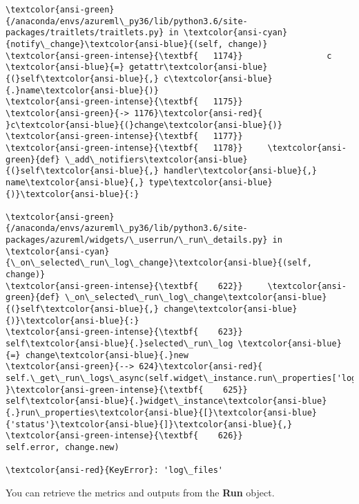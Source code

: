 \documentclass[11pt]{article}
\begin{document}
\begin{Verbatim}[commandchars=\\\{\}, frame=single, framerule=2mm, rulecolor=\color{outerrorbackground}]
\textcolor{ansi-green}{/anaconda/envs/azureml\_py36/lib/python3.6/site-packages/traitlets/traitlets.py} in \textcolor{ansi-cyan}{notify\_change}\textcolor{ansi-blue}{(self, change)}
\textcolor{ansi-green-intense}{\textbf{   1174}}                 c \textcolor{ansi-blue}{=} getattr\textcolor{ansi-blue}{(}self\textcolor{ansi-blue}{,} c\textcolor{ansi-blue}{.}name\textcolor{ansi-blue}{)}
\textcolor{ansi-green-intense}{\textbf{   1175}} 
\textcolor{ansi-green}{-> 1176}\textcolor{ansi-red}{             }c\textcolor{ansi-blue}{(}change\textcolor{ansi-blue}{)}
\textcolor{ansi-green-intense}{\textbf{   1177}} 
\textcolor{ansi-green-intense}{\textbf{   1178}}     \textcolor{ansi-green}{def} \_add\_notifiers\textcolor{ansi-blue}{(}self\textcolor{ansi-blue}{,} handler\textcolor{ansi-blue}{,} name\textcolor{ansi-blue}{,} type\textcolor{ansi-blue}{)}\textcolor{ansi-blue}{:}

\textcolor{ansi-green}{/anaconda/envs/azureml\_py36/lib/python3.6/site-packages/azureml/widgets/\_userrun/\_run\_details.py} in \textcolor{ansi-cyan}{\_on\_selected\_run\_log\_change}\textcolor{ansi-blue}{(self, change)}
\textcolor{ansi-green-intense}{\textbf{    622}}     \textcolor{ansi-green}{def} \_on\_selected\_run\_log\_change\textcolor{ansi-blue}{(}self\textcolor{ansi-blue}{,} change\textcolor{ansi-blue}{)}\textcolor{ansi-blue}{:}
\textcolor{ansi-green-intense}{\textbf{    623}}         self\textcolor{ansi-blue}{.}selected\_run\_log \textcolor{ansi-blue}{=} change\textcolor{ansi-blue}{.}new
\textcolor{ansi-green}{--> 624}\textcolor{ansi-red}{         self.\_get\_run\_logs\_async(self.widget\_instance.run\_properties['log\_files'],
}\textcolor{ansi-green-intense}{\textbf{    625}}                                  self\textcolor{ansi-blue}{.}widget\_instance\textcolor{ansi-blue}{.}run\_properties\textcolor{ansi-blue}{[}\textcolor{ansi-blue}{'status'}\textcolor{ansi-blue}{]}\textcolor{ansi-blue}{,}
\textcolor{ansi-green-intense}{\textbf{    626}}                                  self.error, change.new)

\textcolor{ansi-red}{KeyError}: 'log\_files'
    \end{Verbatim}

    You can retrieve the metrics and outputs from the \textbf{Run} object.
\end{document}
